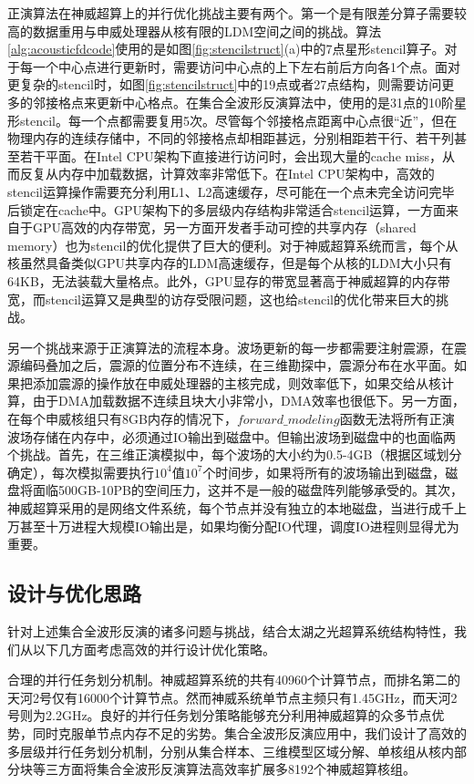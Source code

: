 \documentclass[degree=doctor]{thuthesis}
\begin{document}
正演算法在神威超算上的并行优化挑战主要有两个。第一个是有限差分算子需要较高的数据重用与申威处理器从核有限的LDM空间之间的挑战。算法\ref{alg:acousticfdcode}使用的是如图\ref{fig:stencilstruct}(a)中的7点星形stencil算子。对于每一个中心点进行更新时，需要访问中心点的上下左右前后方向各1个点。面对更复杂的stencil时，如图\ref{fig:stencilstruct}中的19点或者27点结构，则需要访问更多的邻接格点来更新中心格点。在集合全波形反演算法中，使用的是31点的10阶星形stencil。每一个点都需要复用5次。尽管每个邻接格点距离中心点很“近”，但在物理内存的连续存储中，不同的邻接格点却相距甚远，分别相距若干行、若干列甚至若干平面。在Intel CPU架构下直接进行访问时，会出现大量的cache miss，从而反复从内存中加载数据，计算效率非常低下。在Intel CPU架构中，高效的stencil运算操作需要充分利用L1、L2高速缓存，尽可能在一个点未完全访问完毕后锁定在cache中\cite{datta2008stencil,datta2009optimization,sellappa2004cache}。GPU架构下的多层级内存结构非常适合stencil运算，一方面来自于GPU高效的内存带宽，另一方面开发者手动可控的共享内存（shared memory）也为stencil的优化提供了巨大的便利\cite{meng2009performance,nguyen20103,micikevicius20093d}。对于神威超算系统而言，每个从核虽然具备类似GPU共享内存的LDM高速缓存，但是每个从核的LDM大小只有64KB，无法装载大量格点。此外，GPU显存的带宽显著高于神威超算的内存带宽，而stencil运算又是典型的访存受限问题，这也给stencil的优化带来巨大的挑战。

另一个挑战来源于正演算法的流程本身。波场更新的每一步都需要注射震源，在震源编码叠加之后，震源的位置分布不连续，在三维勘探中，震源分布在水平面。如果把添加震源的操作放在申威处理器的主核完成，则效率低下，如果交给从核计算，由于DMA加载数据不连续且块大小非常小，DMA效率也很低下。另一方面，在每个申威核组只有8GB内存的情况下，$forward\_modeling$函数无法将所有正演波场存储在内存中，必须通过IO输出到磁盘中。但输出波场到磁盘中的也面临两个挑战。首先，在三维正演模拟中，每个波场的大小约为0.5-4GB（根据区域划分确定），每次模拟需要执行$10^4$值$10^7$个时间步，如果将所有的波场输出到磁盘，磁盘将面临500GB-10PB的空间压力，这并不是一般的磁盘阵列能够承受的。其次，神威超算采用的是网络文件系统，每个节点并没有独立的本地磁盘，当进行成千上万甚至十万进程大规模IO输出是，如果均衡分配IO代理，调度IO进程则显得尤为重要。


\subsection{设计与优化思路}

针对上述集合全波形反演的诸多问题与挑战，结合太湖之光超算系统结构特性，我们从以下几方面考虑高效的并行设计优化策略。

合理的并行任务划分机制。神威超算系统的共有40960个计算节点，而排名第二的天河2号仅有16000个计算节点\cite{tianhe-2}。然而神威系统单节点主频只有1.45GHz，而天河2号则为2.2GHz。良好的并行任务划分策略能够充分利用神威超算的众多节点优势，同时克服单节点内存不足的劣势。集合全波形反演应用中，我们设计了高效的多层级并行任务划分机制，分别从集合样本、三维模型区域分解、单核组从核内部分块等三方面将集合全波形反演算法高效率扩展多8192个神威超算核组。
\end{document}
